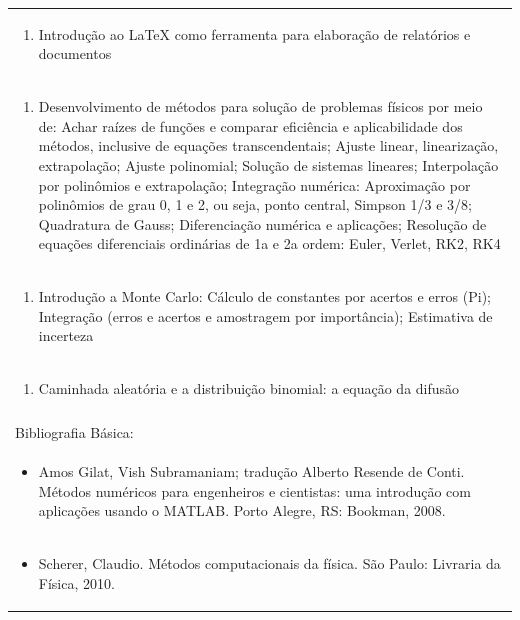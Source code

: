 \documentclass[11pt]{article}
\begin{document}
\begin{center}
\begin{longtable}{|p{4cm}|p{4cm}|p{4cm}|p{4cm}|}
\multicolumn{4}{|p{\dimexpr 16cm + 6\tabcolsep\relax}|}{\begin{enumerate}[start=2]\item Introdução ao LaTeX como ferramenta para elaboração de relatórios e documentos\end{enumerate}}\\
\multicolumn{4}{|p{\dimexpr 16cm + 6\tabcolsep\relax}|}{\begin{enumerate}[start=3]\item Desenvolvimento de métodos para solução de problemas físicos por meio de: Achar raízes de funções e comparar eficiência e aplicabilidade dos métodos, inclusive de equações transcendentais; Ajuste linear, linearização, extrapolação; Ajuste polinomial; Solução de sistemas lineares; Interpolação por polinômios e extrapolação; Integração numérica: Aproximação por polinômios de grau 0, 1 e 2, ou seja, ponto central, Simpson 1/3 e 3/8; Quadratura de Gauss; Diferenciação numérica e aplicações; Resolução de equações diferenciais ordinárias de 1a e 2a ordem: Euler, Verlet, RK2, RK4\end{enumerate}}\\
\multicolumn{4}{|p{\dimexpr 16cm + 6\tabcolsep\relax}|}{\begin{enumerate}[start=4]\item Introdução a Monte Carlo: Cálculo de constantes por acertos e erros (Pi); Integração (erros e acertos e amostragem por importância); Estimativa de incerteza\end{enumerate}}\\
\multicolumn{4}{|p{\dimexpr 16cm + 6\tabcolsep\relax}|}{\begin{enumerate}[start=5]\item Caminhada aleatória e a distribuição binomial: a equação da difusão\end{enumerate}}\\
\multicolumn{4}{|p{\dimexpr 16cm + 6\tabcolsep\relax}|}{}\\
\hline
\multicolumn{4}{|p{16cm}|}{Bibliografia Básica:}\\*
\multicolumn{4}{|p{\dimexpr 16cm + 6\tabcolsep\relax}|}{\begin{itemize}\item Amos Gilat, Vish Subramaniam; tradução Alberto Resende de Conti. Métodos numéricos para engenheiros e cientistas: uma introdução com aplicações usando o MATLAB. Porto Alegre, RS: Bookman, 2008.\end{itemize}}\\
\multicolumn{4}{|p{\dimexpr 16cm + 6\tabcolsep\relax}|}{\begin{itemize}\item Scherer, Claudio. Métodos computacionais da física. São Paulo: Livraria da Física, 2010.\end{itemize}}\\

\end{longtable}
\end{center}
\end{document}
